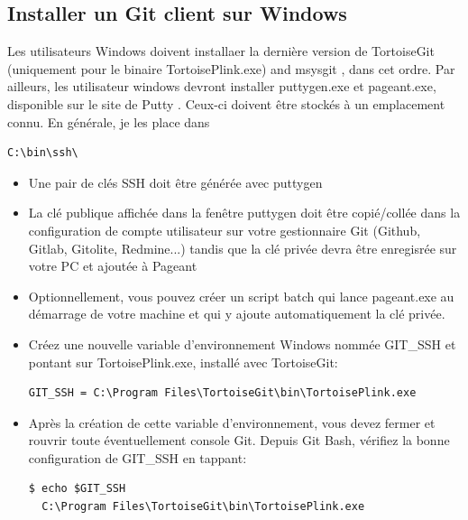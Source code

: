 \documentclass{../../common/tufte-latex/tufte-handout}
\begin{document}
\subsection{Installer un Git client sur Windows}\label{sec:preparation}

Les utilisateurs Windows doivent installaer la dernière version de TortoiseGit  (uniquement pour le binaire TortoisePlink.exe) and msysgit , dans cet ordre.
Par ailleurs, les utilisateur windows devront installer puttygen.exe et pageant.exe, disponible sur le site de Putty . Ceux-ci doivent être stockés à un emplacement connu. En générale, je les place dans 

\begin{lstlisting}[style=BashInputStyle]
  C:\bin\ssh\
\end{lstlisting}

\begin{itemize}

\item{Une pair de clés SSH doit être générée avec puttygen}
\item{La clé publique affichée dans la fenêtre puttygen doit être copié/collée dans la configuration de compte utilisateur sur votre gestionnaire Git (Github, Gitlab, Gitolite, Redmine...) tandis que la clé privée devra être enregisrée sur votre PC et ajoutée à Pageant} 
\item{Optionnellement, vous pouvez créer un script batch qui lance pageant.exe au démarrage de votre machine et qui y ajoute automatiquement la clé privée.}
\item{Créez une nouvelle variable d'environnement Windows nommée GIT\_SSH et pontant sur TortoisePlink.exe, installé avec TortoiseGit:}
\begin{lstlisting}[style=BashInputStyle]
  GIT_SSH = C:\Program Files\TortoiseGit\bin\TortoisePlink.exe
\end{lstlisting}
\item{Après la création de cette variable d'environnement, vous devez fermer et rouvrir toute éventuellement console Git. Depuis Git Bash, vérifiez la bonne configuration de GIT\_SSH en tappant:}

\begin{lstlisting}[style=BashInputStyle]
  $ echo $GIT_SSH
  C:\Program Files\TortoiseGit\bin\TortoisePlink.exe
\end{lstlisting}

\end{itemize}
\end{document}
